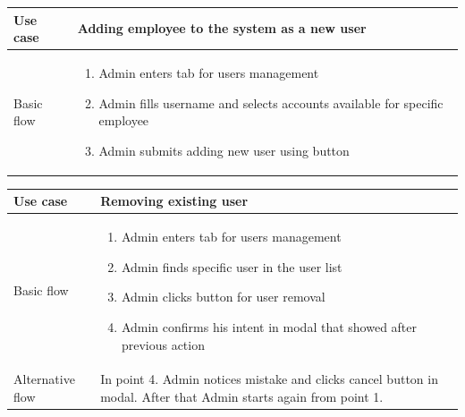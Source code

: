 \documentclass[licencjacka,en]{thesisclass}
\begin{document}
    \begin{center}
      \begin{tabular} {| l | p{13cm} |}
      \hline
      Use case & Adding employee to the system as a new user \\ \hline
      Basic flow &
        \begin{enumerate}
        \item Admin enters tab for users management
        \item Admin fills username and selects accounts available for specific employee
        \item Admin submits adding new user using button
        \end{enumerate}
        \\
      \hline
      \end{tabular}
    \end{center}

    \begin{center}
      \begin{tabular} {| l | p{12cm} |}
      \hline
      Use case & Removing existing user \\ \hline
      Basic flow &
        \begin{enumerate}
        \item Admin enters tab for users management
        \item Admin finds specific user in the user list
        \item Admin clicks button for user removal
        \item Admin confirms his intent in modal that showed after previous action
        \end{enumerate}
        \\ \hline
      Alternative flow & In point 4. Admin notices mistake and clicks cancel button in modal. After that Admin starts again from point 1. \\
      \hline
      \end{tabular}
    \end{center}
\end{document}
